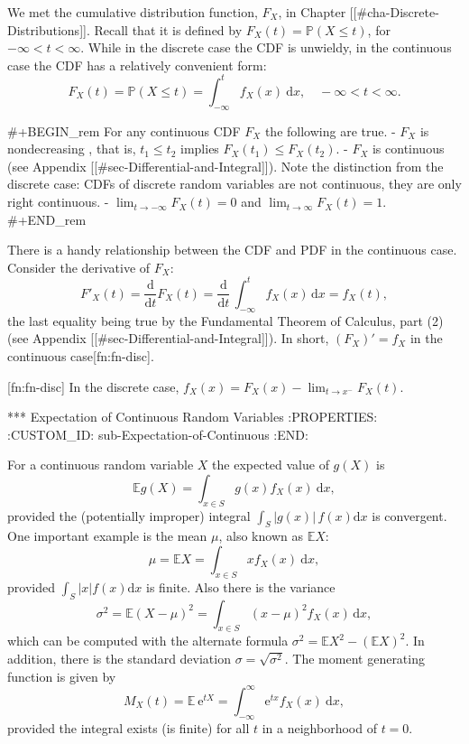 We met the cumulative distribution function, \(F_{X}\), in Chapter
[[#cha-Discrete-Distributions]]. Recall that it is defined by
\(F_{X}(t)=\mathbb{P}(X\leq t)\), for \(-\infty<t<\infty\). While in
the discrete case the CDF is unwieldy, in the continuous case the CDF
has a relatively convenient form:
\begin{equation}
F_{X}(t)=\mathbb{P}(X\leq t)=\int_{-\infty}^{t}f_{X}(x)\:\mathrm{d} x,\quad -\infty < t < \infty.
\end{equation}

#+BEGIN_rem
For any continuous CDF \(F_{X}\) the following are true.
- \(F_{X}\) is nondecreasing , that is, \(t_{1}\leq t_{2}\) implies
  \(F_{X}(t_{1})\leq F_{X}(t_{2})\).
- \(F_{X}\) is continuous (see Appendix
  [[#sec-Differential-and-Integral]]). Note the distinction from the
  discrete case: CDFs of discrete random variables are not continuous,
  they are only right continuous.
- \(\lim_{t\to-\infty}F_{X}(t)=0\) and
  \(\lim_{t\to\infty}F_{X}(t)=1\).
#+END_rem

There is a handy relationship between the CDF and PDF in the
continuous case. Consider the derivative of \(F_{X}\):
\begin{equation}
F'_{X}(t)=\frac{\mathrm{d}}{\mathrm{d} t}F_{X}(t)=\frac{\mathrm{d}}{\mathrm{d} t}\,\int_{-\infty}^{t}f_{X}(x)\,\mathrm{d} x=f_{X}(t),
\end{equation}
the last equality being true by the Fundamental Theorem of Calculus,
part (2) (see Appendix [[#sec-Differential-and-Integral]]). In short,
\((F_{X})'=f_{X}\) in the continuous case[fn:fn-disc].

[fn:fn-disc] In the discrete case, \(f_{X}(x)=F_{X}(x)-\lim_{t\to
x^{-}}F_{X}(t)\).

*** Expectation of Continuous Random Variables
:PROPERTIES:
:CUSTOM_ID: sub-Expectation-of-Continuous
:END:

For a continuous random variable \(X\) the expected value of \(g(X)\)
is
\begin{equation}
\mathbb{E} g(X)=\int_{x\in S}g(x)f_{X}(x)\:\mathrm{d} x,
\end{equation}
provided the (potentially improper) integral \(\int_{S}|g(x)|\,
f(x)\mathrm{d} x\) is convergent. One important example is the mean
\(\mu\), also known as \(\mathbb{E} X\):
\begin{equation}
\mu=\mathbb{E} X=\int_{x\in S}xf_{X}(x)\:\mathrm{d} x,
\end{equation}
provided \(\int_{S}|x|f(x)\mathrm{d} x\) is finite. Also there is the variance
\begin{equation}
\sigma^{2}=\mathbb{E}(X-\mu)^{2}=\int_{x\in S}(x-\mu)^{2}f_{X}(x)\,\mathrm{d} x,
\end{equation}
which can be computed with the alternate formula
\(\sigma^{2}=\mathbb{E} X^{2}-(\mathbb{E} X)^{2}\). In addition, there
is the standard deviation \(\sigma=\sqrt{\sigma^{2}}\). The moment
generating function is given by
\begin{equation}
M_{X}(t)=\mathbb{E}\:\mathrm{e}^{tX}=\int_{-\infty}^{\infty}\mathrm{e}^{tx}f_{X}(x)\:\mathrm{d} x,
\end{equation}
provided the integral exists (is finite) for all \(t\) in a
neighborhood of \(t=0\).

